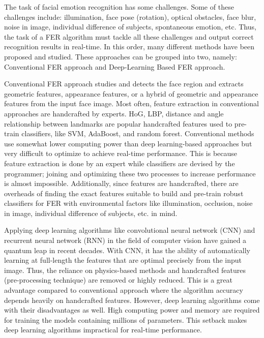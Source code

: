 \documentclass[master]{thesis-uestc}
\begin{document}
The task of facial emotion recognition has some challenges. Some of these challenges include: illumination, face pose (rotation), optical obstacles, face blur, noise in image, individual difference of subjects, spontaneous emotion, etc\cite{Ivanovsky-2017, josh2018}. Thus, the task of a FER algorithm must tackle all these challenges and output correct recognition results in real-time. In this order, many different methods have been proposed and studied. These approaches can be grouped into two, namely: Conventional FER approach and Deep-Learning Based FER approach\cite{Ivanovsky-2017}.

Conventional FER approach studies and detects the face region and extracts geometric features, appearance features, or a hybrid of geometric and appearance features from the input face image. Most often, feature extraction in conventional approaches are handcrafted by experts. HoG, LBP, distance and angle relationship between landmarks are popular handcrafted features used to pre-train classifiers, like SVM, AdaBoost, and random forest\cite{Ivanovsky-2017}. Conventional methods use somewhat lower computing power than deep learning-based approaches but very difficult to optimize to achieve real-time performance. This is because feature extraction is done by an expert while classifiers are devised by the programmer; joining and optimizing these two processes to increase performance is almost impossible\cite{Ivanovsky-2017}. Additionally, since features are handcrafted, there are overheads of finding the exact features suitable to build and pre-train robust classifiers for FER with environmental factors like illumination, occlusion, noise in image, individual difference of subjects, etc. in mind.

Applying deep learning algorithms like convolutional neural network (CNN) and recurrent neural network (RNN) in the field of computer vision have gained a quantum leap in recent decades. With CNN, it has the ability of automatically learning at full-length the features that are optimal precisely from the input image. Thus, the reliance on physics-based methods and handcrafted features (pre-processing technique) are removed or highly reduced. This is a great advantage compared to conventional approach where the algorithm accuracy depends heavily on handcrafted features. However, deep learning algorithms come with their disadvantages as well. High computing power and memory are required for training the models containing millions of parameters. This setback makes deep learning algorithms impractical for real-time performance.
\end{document}
